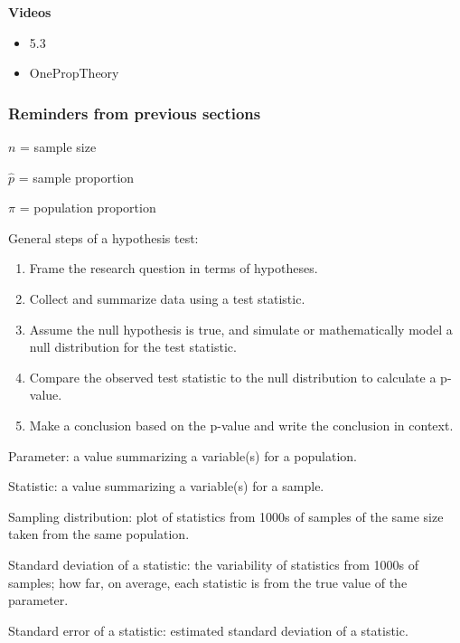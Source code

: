 \documentclass[
]{report}
\providecommand{\tightlist}{%
  \setlength{\itemsep}{0pt}\setlength{\parskip}{0pt}}
\begin{document}
\newpage

\textbf{Videos}

\begin{itemize}
\tightlist
\item
  5.3
\item
  OnePropTheory
\end{itemize}


\hypertarget{reminders-from-previous-sections}{%
\subsubsection*{Reminders from previous sections}\label{reminders-from-previous-sections}}

\(n\) = sample size

\(\hat{p}\) = sample proportion

\(\pi\) = population proportion

General steps of a hypothesis test:

\begin{enumerate}
\def\labelenumi{\arabic{enumi}.}
\item
  Frame the research question in terms of hypotheses.
\item
  Collect and summarize data using a test statistic.
\item
  Assume the null hypothesis is true, and simulate or mathematically model a null distribution for the test statistic.
\item
  Compare the observed test statistic to the null distribution to calculate a p-value.
\item
  Make a conclusion based on the p-value and write the conclusion in context.
\end{enumerate}

Parameter: a value summarizing a variable(s) for a population.

Statistic: a value summarizing a variable(s) for a sample.

Sampling distribution: plot of statistics from 1000s of samples of the same size taken from the same population.

Standard deviation of a statistic: the variability of statistics from 1000s of samples; how far, on average, each statistic is from the true value of the parameter.

Standard error of a statistic: estimated standard deviation of a statistic.
\end{document}
